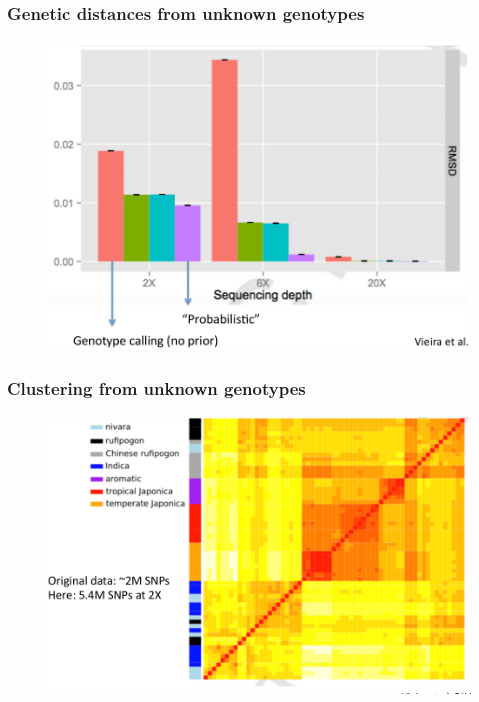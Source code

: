 
\begin{frame}
\frametitle{Genetic distances from \textbf{unknown} genotypes}

        \begin{figure}
                \includegraphics[width=\textwidth]{Pics/gdist_6.png}
        \end{figure}

\end{frame}


\begin{frame}
\frametitle{Clustering from \textbf{unknown} genotypes}

        \begin{figure}
                \includegraphics[width=\textwidth]{Pics/gdist_7.png}
        \end{figure}

\end{frame}


